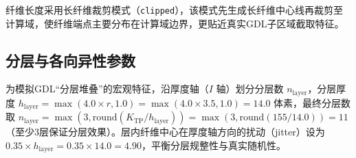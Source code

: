 {\raggedright
\hspace{2em}纤维长度采用长纤维裁剪模式（\texttt{clipped}），该模式先生成长纤维中心线再裁剪至计算域，使纤维端点主要分布在计算域边界，更贴近真实GDL子区域截取特征。
\par}
\subsection{分层与各向异性参数}
为模拟GDL“分层堆叠”的宏观特征，沿厚度轴（$I$ 轴）划分分层数 $n_{\mathrm{layer}}$，分层厚度 $h_{\text{layer}} = \max(4.0 \times r, 1.0)= \max(4.0 \times 3.5, 1.0) = 14.0$ 体素，最终分层数取 $n_{\text{layer}} = \max(3, \text{round}(K_{\text{TP}} / h_{\text{layer}})) = \max(3, \text{round}(155 / 14.0)) = 11$ （至少3层保证分层效果）。层内纤维中心在厚度轴方向的扰动（jitter）设为 $0.35 \times h_{\text{layer}} = 0.35 \times 14.0 = 4.90$，平衡分层规整性与真实随机性。

